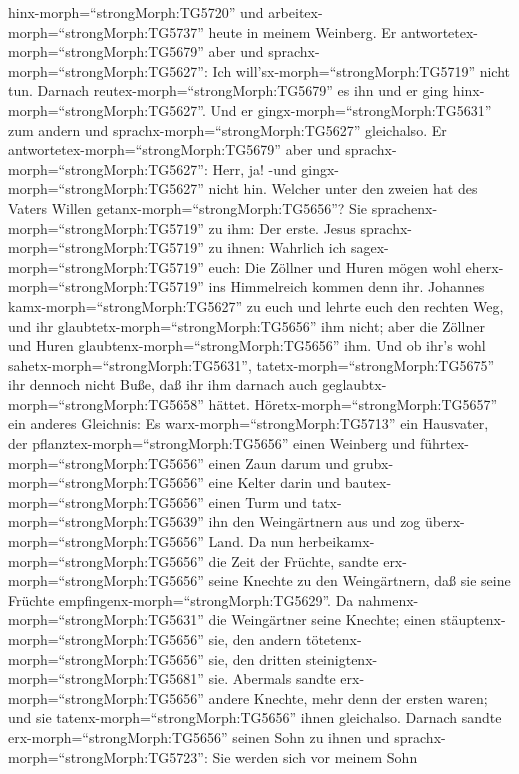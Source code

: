 hinx-morph=``strongMorph:TG5720'' und
arbeitex-morph=``strongMorph:TG5737'' heute in meinem Weinberg.
 Er antwortetex-morph=``strongMorph:TG5679'' aber und
sprachx-morph=``strongMorph:TG5627'': Ich
will'sx-morph=``strongMorph:TG5719'' nicht tun. Darnach
reutex-morph=``strongMorph:TG5679'' es ihn und er ging
hinx-morph=``strongMorph:TG5627''.  Und er
gingx-morph=``strongMorph:TG5631'' zum andern und
sprachx-morph=``strongMorph:TG5627'' gleichalso. Er
antwortetex-morph=``strongMorph:TG5679'' aber und
sprachx-morph=``strongMorph:TG5627'': Herr, ja! -und
gingx-morph=``strongMorph:TG5627'' nicht hin.  Welcher
unter den zweien hat des Vaters Willen
getanx-morph=``strongMorph:TG5656''? Sie
sprachenx-morph=``strongMorph:TG5719'' zu ihm: Der erste. Jesus
sprachx-morph=``strongMorph:TG5719'' zu ihnen: Wahrlich ich
sagex-morph=``strongMorph:TG5719'' euch: Die Zöllner und Huren mögen
wohl eherx-morph=``strongMorph:TG5719'' ins Himmelreich kommen denn ihr.
 Johannes kamx-morph=``strongMorph:TG5627'' zu euch und
lehrte euch den rechten Weg, und ihr
glaubtetx-morph=``strongMorph:TG5656'' ihm nicht; aber die Zöllner und
Huren glaubtenx-morph=``strongMorph:TG5656'' ihm. Und ob ihr's wohl
sahetx-morph=``strongMorph:TG5631'', tatetx-morph=``strongMorph:TG5675''
ihr dennoch nicht Buße, daß ihr ihm darnach auch
geglaubtx-morph=``strongMorph:TG5658'' hättet. 
Höretx-morph=``strongMorph:TG5657'' ein anderes Gleichnis: Es
warx-morph=``strongMorph:TG5713'' ein Hausvater, der
pflanztex-morph=``strongMorph:TG5656'' einen Weinberg und
führtex-morph=``strongMorph:TG5656'' einen Zaun darum und
grubx-morph=``strongMorph:TG5656'' eine Kelter darin und
bautex-morph=``strongMorph:TG5656'' einen Turm und
tatx-morph=``strongMorph:TG5639'' ihn den Weingärtnern aus und zog
überx-morph=``strongMorph:TG5656'' Land.  Da nun
herbeikamx-morph=``strongMorph:TG5656'' die Zeit der Früchte, sandte
erx-morph=``strongMorph:TG5656'' seine Knechte zu den Weingärtnern, daß
sie seine Früchte empfingenx-morph=``strongMorph:TG5629''. 
Da nahmenx-morph=``strongMorph:TG5631'' die Weingärtner seine Knechte;
einen stäuptenx-morph=``strongMorph:TG5656'' sie, den andern
tötetenx-morph=``strongMorph:TG5656'' sie, den dritten
steinigtenx-morph=``strongMorph:TG5681'' sie.  Abermals
sandte erx-morph=``strongMorph:TG5656'' andere Knechte, mehr denn der
ersten waren; und sie tatenx-morph=``strongMorph:TG5656'' ihnen
gleichalso.  Darnach sandte
erx-morph=``strongMorph:TG5656'' seinen Sohn zu ihnen und
sprachx-morph=``strongMorph:TG5723'': Sie werden sich vor meinem Sohn
